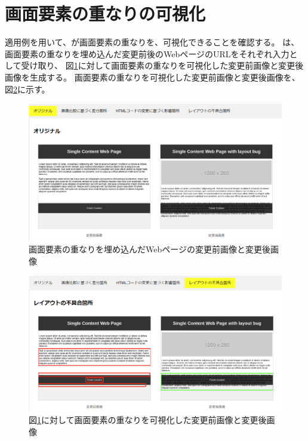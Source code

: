 \section{画面要素の重なりの可視化}\label{sec:result_area_detecti}
適用例を用いて、\toolName が画面要素の重なりを、可視化できることを確認する。
\toolName は、画面要素の重なりを埋め込んだ変更前後のWebページのURLをそれぞれ入力として受け取り、
図\ref{fig: ex3_original}に対して画面要素の重なりを可視化した変更前画像と変更後画像を生成する。
画面要素の重なりを可視化した変更前画像と変更後画像を、図\ref{fig: ex3_subeffect}に示す。
\begin{figure}[tp]
    \begin{center}
        \includegraphics[width=1.0\columnwidth]{image/5/ex3_original.png}
        \caption{画面要素の重なりを埋め込んだWebページの変更前画像と変更後画像}
        \label{fig: ex3_original}
    \end{center}
\end{figure}
\begin{figure}[tp]
    \begin{center}
        \includegraphics[width=1.0\columnwidth]{image/5/ex3_subeffect.png}
        \caption{図\ref{fig: ex3_original}に対して画面要素の重なりを可視化した変更前画像と変更後画像}
        \label{fig: ex3_subeffect}
    \end{center}
\end{figure}
